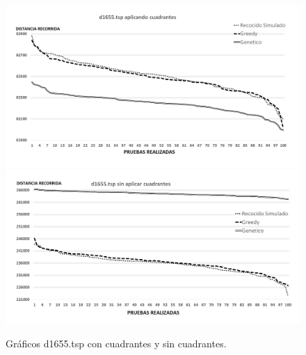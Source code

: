  \begin{figure}[hbtp]
    \centering
        \includegraphics[width=1\textwidth]{PruebasResultados/Experimentos_Graficos_Con/d1655.png}
        \includegraphics[width=1\textwidth]{PruebasResultados/Experimentos_Graficos_Sin/d1655.png}
        \caption{Gráficos d1655.tsp con cuadrantes y sin cuadrantes.}
        \label{fig:d1655_grafica.png}
\end{figure}
\newpage

